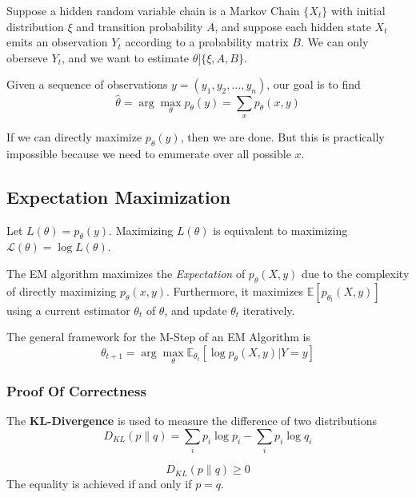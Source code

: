     Suppose a hidden random variable chain is a Markov Chain $\{X_t\}$ with initial distribution $\xi$ and transition probability $A$, and suppose each hidden state $X_t$ emits an observation $Y_t$ according to a probability matrix $B$. We can only oberseve $Y_t$, and we want to estimate $\theta ] \{\xi, A, B\}$.

    Given a sequence of observations $y = (y_1, y_2, \dots ,y_n)$, our goal is to find
    \[ \hat{\theta} = \arg\max_{\theta} p_{\theta}(y) = \sum_x p_{\theta}(x,y) \]

    If we can directly maximize $p_{\theta}(y)$, then we are done. But this is practically impossible because we need to enumerate over all possible $x$.
    
    \subsection{Expectation Maximization}
        Let $L(\theta) = p_{\theta}(y)$. Maximizing $L(\theta)$ is equivalent to maximizing $\mathcal{L}(\theta) = \log L(\theta)$.

        The EM algorithm maximizes the \emph{Expectation} of $p_{\theta}(X,y)$ due to the complexity of directly maximizing $p_{\theta}(x,y)$. Furthermore, it maximizes $\mathbb{E}[p_{\theta_t}(X,y)]$ using a current estimator $\theta_t$ of $\theta$, and update $\theta_t$ iteratively.

        The general framework for the M-Step of an EM Algorithm is
        \[ \theta_{t+1} = \arg\max_{\theta} \mathbb{E}_{\theta_t}\left[ \log p_{\theta}(X,y)|Y=y \right] \]

        \subsubsection{Proof Of Correctness}
        \begin{definition}[KL Divergence]\label{def:KLDivergence}
            The \textbf{KL-Divergence} is used to measure the difference of two distributions
            \[ D_{KL}(p\|q) = \sum_i p_i\log p_i - \sum_i p_i \log q_i \]
        \end{definition}
        \begin{proposition}\label{prop:PositivityOfKLDivergence}
            \[ D_{KL}(p\|q) \ge 0 \]
            The equality is achieved if and only if $p=q$.
        \end{proposition}

